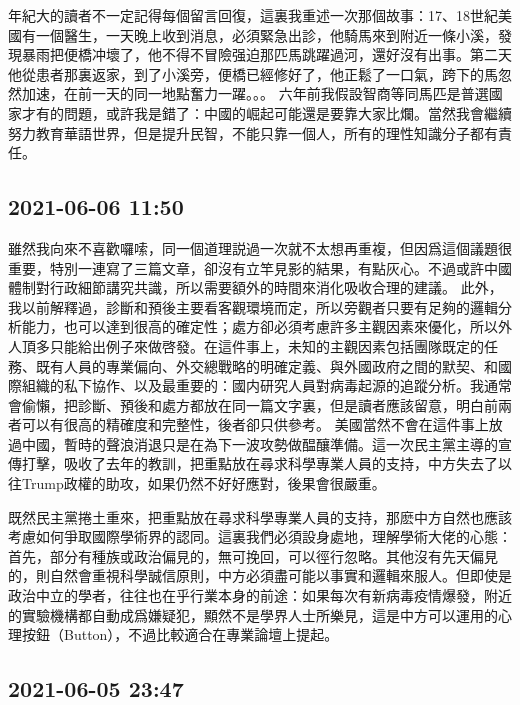 \documentclass[twocolumn]{ctexart}
\begin{document}
年紀大的讀者不一定記得每個留言回復，這裏我重述一次那個故事：17、18世紀美國有一個醫生，一天晚上收到消息，必須緊急出診，他騎馬來到附近一條小溪，發現暴雨把便橋冲壞了，他不得不冒險强迫那匹馬跳躍過河，還好沒有出事。第二天他從患者那裏返家，到了小溪旁，便橋已經修好了，他正鬆了一口氣，跨下的馬忽然加速，在前一天的同一地點奮力一躍。。。
六年前我假設智商等同馬匹是普選國家才有的問題，或許我是錯了：中國的崛起可能還是要靠大家比爛。當然我會繼續努力教育華語世界，但是提升民智，不能只靠一個人，所有的理性知識分子都有責任。
\subsection*{2021-06-06 11:50}

雖然我向來不喜歡囉嗦，同一個道理説過一次就不太想再重複，但因爲這個議題很重要，特別一連寫了三篇文章，卻沒有立竿見影的結果，有點灰心。不過或許中國體制對行政細節講究共識，所以需要額外的時間來消化吸收合理的建議。
此外，我以前解釋過，診斷和預後主要看客觀環境而定，所以旁觀者只要有足夠的邏輯分析能力，也可以達到很高的確定性；處方卻必須考慮許多主觀因素來優化，所以外人頂多只能給出例子來做啓發。在這件事上，未知的主觀因素包括團隊既定的任務、既有人員的專業偏向、外交總戰略的明確定義、與外國政府之間的默契、和國際組織的私下協作、以及最重要的：國内研究人員對病毒起源的追蹤分析。我通常會偷懶，把診斷、預後和處方都放在同一篇文字裏，但是讀者應該留意，明白前兩者可以有很高的精確度和完整性，後者卻只供參考。
美國當然不會在這件事上放過中國，暫時的聲浪消退只是在為下一波攻勢做醖釀準備。這一次民主黨主導的宣傳打擊，吸收了去年的教訓，把重點放在尋求科學專業人員的支持，中方失去了以往Trump政權的助攻，如果仍然不好好應對，後果會很嚴重。

既然民主黨捲土重來，把重點放在尋求科學專業人員的支持，那麽中方自然也應該考慮如何爭取國際學術界的認同。這裏我們必須設身處地，理解學術大佬的心態：首先，部分有種族或政治偏見的，無可挽回，可以徑行忽略。其他沒有先天偏見的，則自然會重視科學誠信原則，中方必須盡可能以事實和邏輯來服人。但即使是政治中立的學者，往往也在乎行業本身的前途：如果每次有新病毒疫情爆發，附近的實驗機構都自動成爲嫌疑犯，顯然不是學界人士所樂見，這是中方可以運用的心理按鈕（Button），不過比較適合在專業論壇上提起。
\subsection*{2021-06-05 23:47}
\end{document}
